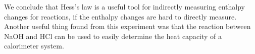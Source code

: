 We conclude that Hess's law is a useful tool for indirectly measuring enthalpy changes for reactions, if the enthalpy changes are hard to directly measure. Another useful thing found from this experiment was that the reaction between NaOH and HCl can be used to easily determine the heat capacity of a calorimeter system.
